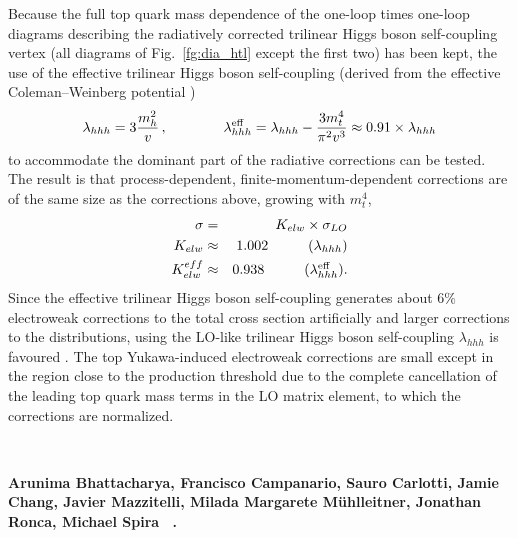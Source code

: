 Because the full top quark mass dependence of the one-loop times one-loop diagrams describing the radiatively corrected trilinear Higgs boson self-coupling vertex (all diagrams of Fig.~\ref{fg:dia_htl} except the first two) has been kept, the use of the effective trilinear Higgs boson self-coupling (derived from the effective Coleman--Weinberg potential \cite{Coleman:1973jx,Weinberg:1973ua,Jackiw:1974cv})
\begin{equation}
\lambda_{hhh} = 3 \frac{m_h^2}{v} \, , \qquad\qquad \lambda_{hhh}^{\rm eff} = \lambda_{hhh} - \frac{3 m_t^4}{\pi^2 v^3} \approx 0.91 \times \lambda_{hhh}
\end{equation}
to accommodate the dominant part of the radiative corrections can be tested. The result is that process-dependent, finite-momentum-dependent corrections are of the same size as the corrections above, growing with $m_t^4$,
\begin{eqnarray}
\sigma & = & K_{elw} \times \sigma_{LO} \nonumber \\
K_{elw} & \approx & 1.002 \hspace*{1.0cm} \mbox{($\lambda_{hhh}$)} \nonumber \\
K^{eff}_{elw} & \approx & 0.938 \hspace*{1cm} \mbox{($\lambda^{\rm eff}_{hhh}$)}.
\end{eqnarray}
Since the effective trilinear Higgs boson self-coupling generates about $6\%$ electroweak corrections to the total cross section artificially and larger corrections to the distributions, using the LO-like trilinear Higgs boson self-coupling $\lambda_{hhh}$ is favoured \cite{Muhlleitner:2022ijf}. The top Yukawa-induced electroweak corrections are small except in the region close to the production threshold due to the complete cancellation of the leading top quark mass terms in the LO matrix element, to which the corrections are normalized.

~

\noindent \textbf{Arunima Bhattacharya, Francisco Campanario, Sauro Carlotti, Jamie Chang, Javier Mazzitelli, Milada Margarete Mühlleitner, Jonathan Ronca, Michael Spira ~\cite{Bhattacharya_TBA}.}

